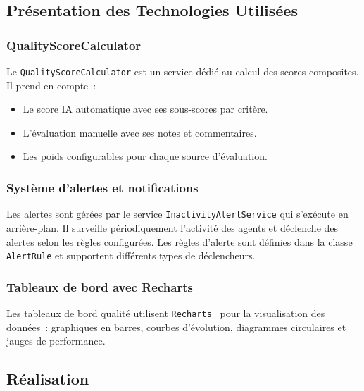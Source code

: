 \subsection{Présentation des Technologies Utilisées}
\label{subsec:sprint4_tech}

\subsubsection{QualityScoreCalculator}

Le \texttt{QualityScoreCalculator} est un service dédié au calcul des scores composites.
Il prend en compte~:

\begin{itemize}
    \item Le score IA automatique avec ses sous-scores par critère.
    \item L'évaluation manuelle avec ses notes et commentaires.
    \item Les poids configurables pour chaque source d'évaluation.
\end{itemize}

\subsubsection{Système d'alertes et notifications}

Les alertes sont gérées par le service \texttt{InactivityAlertService} qui s'exécute en
arrière-plan. Il surveille périodiquement l'activité des agents et déclenche des alertes
selon les règles configurées. Les règles d'alerte sont définies dans la classe
\texttt{AlertRule} et supportent différents types de déclencheurs.

\subsubsection{Tableaux de bord avec Recharts}

Les tableaux de bord qualité utilisent \texttt{Recharts}~\cite{Recharts} pour la
visualisation des données~: graphiques en barres, courbes d'évolution, diagrammes
circulaires et jauges de performance.

\subsection{Réalisation}
\label{subsec:sprint4_realisation}

